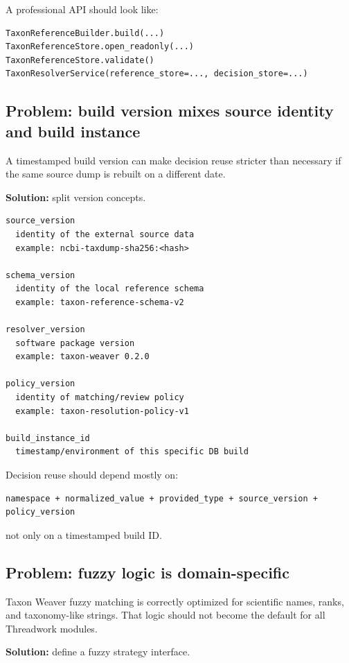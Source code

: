 \documentclass[11pt,a4paper]{article}
\begin{document}
A professional API should look like:

\begin{Verbatim}[fontsize=\small]
TaxonReferenceBuilder.build(...)
TaxonReferenceStore.open_readonly(...)
TaxonReferenceStore.validate()
TaxonResolverService(reference_store=..., decision_store=...)
\end{Verbatim}

\subsection{Problem: build version mixes source identity and build instance}

A timestamped build version can make decision reuse stricter than necessary if the same source dump is rebuilt on a different date.

\textbf{Solution:} split version concepts.

\begin{Verbatim}[fontsize=\small]
source_version
  identity of the external source data
  example: ncbi-taxdump-sha256:<hash>

schema_version
  identity of the local reference schema
  example: taxon-reference-schema-v2

resolver_version
  software package version
  example: taxon-weaver 0.2.0

policy_version
  identity of matching/review policy
  example: taxon-resolution-policy-v1

build_instance_id
  timestamp/environment of this specific DB build
\end{Verbatim}

Decision reuse should depend mostly on:

\begin{Verbatim}[fontsize=\small]
namespace + normalized_value + provided_type + source_version + policy_version
\end{Verbatim}

not only on a timestamped build ID.

\subsection{Problem: fuzzy logic is domain-specific}

Taxon Weaver fuzzy matching is correctly optimized for scientific names, ranks, and taxonomy-like strings. That logic should not become the default for all Threadwork modules.

\textbf{Solution:} define a fuzzy strategy interface.
\end{document}
